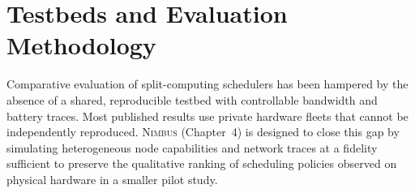 \section{Testbeds and Evaluation Methodology}

Comparative evaluation of split-computing schedulers has been hampered by the absence of a shared, reproducible testbed with controllable bandwidth and battery traces. Most published results use private hardware fleets that cannot be independently reproduced. \textsc{Nimbus} (Chapter~4) is designed to close this gap by simulating heterogeneous node capabilities and network traces at a fidelity sufficient to preserve the qualitative ranking of scheduling policies observed on physical hardware in a smaller pilot study.
